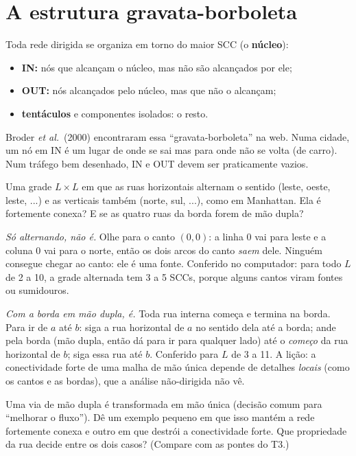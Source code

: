 \documentclass[11pt]{article}
\begin{document}
\section{A estrutura gravata-borboleta}

\begin{ideia}
Toda rede dirigida se organiza em torno do maior SCC (o \textbf{núcleo}):
\begin{itemize}
  \item \textbf{IN:} nós que alcançam o núcleo, mas não são alcançados por ele;
  \item \textbf{OUT:} nós alcançados pelo núcleo, mas que não o alcançam;
  \item \textbf{tentáculos} e componentes isolados: o resto.
\end{itemize}
Broder \emph{et al.}\ (2000) encontraram essa ``gravata-borboleta'' na web. Numa cidade, um nó em IN é um lugar de onde se sai mas para onde não se volta (de carro). Num tráfego bem desenhado, IN e OUT devem ser praticamente vazios.
\end{ideia}

\begin{exemplo}
Uma grade $L\times L$ em que as ruas horizontais alternam o sentido (leste, oeste, leste, ...) e as verticais também (norte, sul, ...), como em Manhattan. Ela é fortemente conexa? E se as quatro ruas da borda forem de mão dupla?
\end{exemplo}
\begin{solucao}
\emph{Só alternando, não é.} Olhe para o canto $(0,0)$: a linha 0 vai para leste e a coluna 0 vai para o norte, então os dois arcos do canto \emph{saem} dele. Ninguém consegue chegar ao canto: ele é uma fonte. Conferido no computador: para todo $L$ de 2 a 10, a grade alternada tem 3 a 5 SCCs, porque alguns cantos viram fontes ou sumidouros.

\emph{Com a borda em mão dupla, é.} Toda rua interna começa e termina na borda. Para ir de $a$ até $b$: siga a rua horizontal de $a$ no sentido dela até a borda; ande pela borda (mão dupla, então dá para ir para qualquer lado) até o \emph{começo} da rua horizontal de $b$; siga essa rua até $b$. Conferido para $L$ de 3 a 11. A lição: a conectividade forte de uma malha de mão única depende de detalhes \emph{locais} (como os cantos e as bordas), que a análise não-dirigida não vê.
\end{solucao}

 Uma via de mão dupla é transformada em mão única (decisão comum para ``melhorar o fluxo''). Dê um exemplo pequeno em que isso mantém a rede fortemente conexa e outro em que destrói a conectividade forte. Que propriedade da rua decide entre os dois casos? (Compare com as pontes do T3.)
\end{document}
